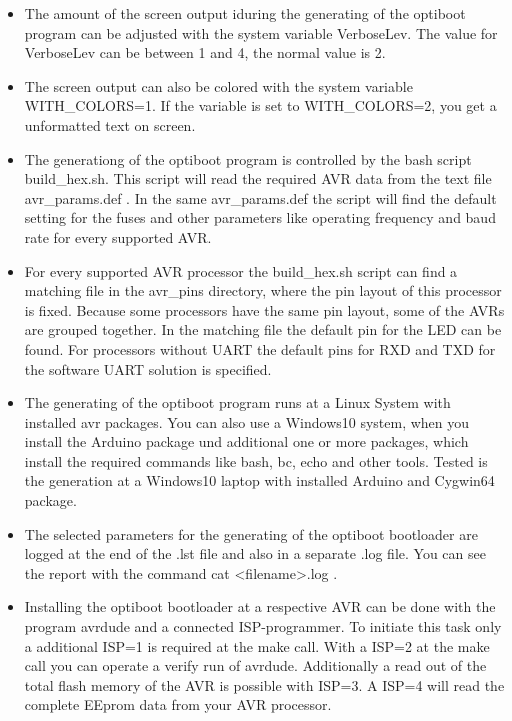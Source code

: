 \begin{itemize}

\item {The amount of the screen output iduring the generating of the optiboot program
	can be adjusted with the system variable VerboseLev. 
	The value for VerboseLev can be between 1 and 4, the normal value is 2.}

\item {The screen output can also be colored with the system variable WITH\_COLORS=1.
	If the variable is set to WITH\_COLORS=2, you get a unformatted text on screen.}

\item {The generationg of the optiboot program is controlled by the bash script build\_hex.sh.
	This script will read the required AVR data from the text file avr\_params.def .
	In the same avr\_params.def the script will find the default setting for the fuses and
		other parameters like operating frequency and baud rate for every supported AVR.}

\item {For every supported AVR processor the build\_hex.sh script can find a matching
	file in the avr\_pins directory, where the pin layout of this processor is fixed.
	Because some processors have the same pin layout, some of the AVRs are grouped together.
	In the matching file the default pin for the LED can be found.
	For processors without UART the default pins for RXD and TXD for the software UART
	solution is specified.}

\item {The generating of the optiboot program runs at a Linux System with installed avr packages.
	You can also use a Windows10 system, when you install the Arduino package und additional
	one or more packages, which install the required commands like bash, bc, echo and other tools.
	Tested is the generation at a Windows10 laptop with installed Arduino and Cygwin64 package.}

\item {The selected parameters for the generating of the optiboot bootloader are logged at the
	end of the .lst file and also in a separate .log file.
	You can see the report with the command cat <filename>.log .}

\item {Installing the optiboot bootloader at a respective AVR can be done with the program avrdude and
	a connected ISP-programmer.
	To initiate this task only a additional ISP=1 is required at the make call.
	With a ISP=2 at the make call you can operate a verify run of avrdude.
	Additionally a read out of the total flash memory of the AVR is possible
	with ISP=3. A ISP=4 will read the complete EEprom data from your AVR processor.}

\end{itemize}


